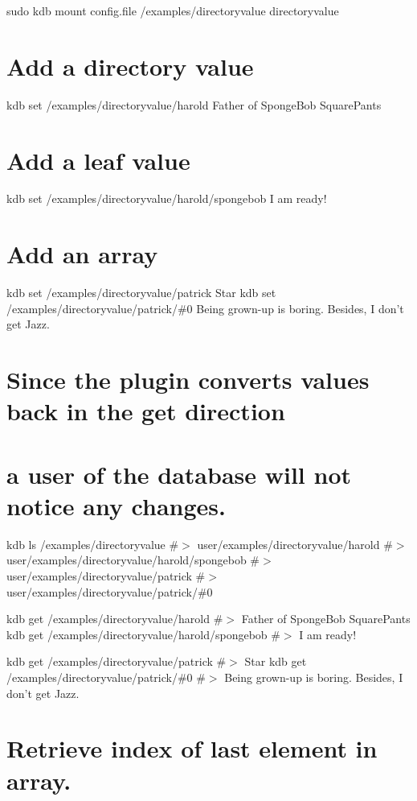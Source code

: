 sudo kdb mount config.\+file /examples/directoryvalue directoryvalue

\section*{Add a directory value}

kdb set /examples/directoryvalue/harold \textquotesingle{}Father of Sponge\+Bob Square\+Pants\textquotesingle{} \section*{Add a leaf value}

kdb set /examples/directoryvalue/harold/spongebob \textquotesingle{}I am ready!\textquotesingle{}

\section*{Add an array}

kdb set /examples/directoryvalue/patrick Star kdb set /examples/directoryvalue/patrick/\#0 \textquotesingle{}Being grown-\/up is boring. Besides, I don’t get Jazz.\textquotesingle{}

\section*{Since the plugin converts values back in the get direction}

\section*{a user of the database will not notice any changes.}

kdb ls /examples/directoryvalue \#$>$ user/examples/directoryvalue/harold \#$>$ user/examples/directoryvalue/harold/spongebob \#$>$ user/examples/directoryvalue/patrick \#$>$ user/examples/directoryvalue/patrick/\#0

kdb get /examples/directoryvalue/harold \#$>$ Father of Sponge\+Bob Square\+Pants kdb get /examples/directoryvalue/harold/spongebob \#$>$ I am ready!

kdb get /examples/directoryvalue/patrick \#$>$ Star kdb get /examples/directoryvalue/patrick/\#0 \#$>$ Being grown-\/up is boring. Besides, I don’t get Jazz.

\section*{Retrieve index of last element in array.}

